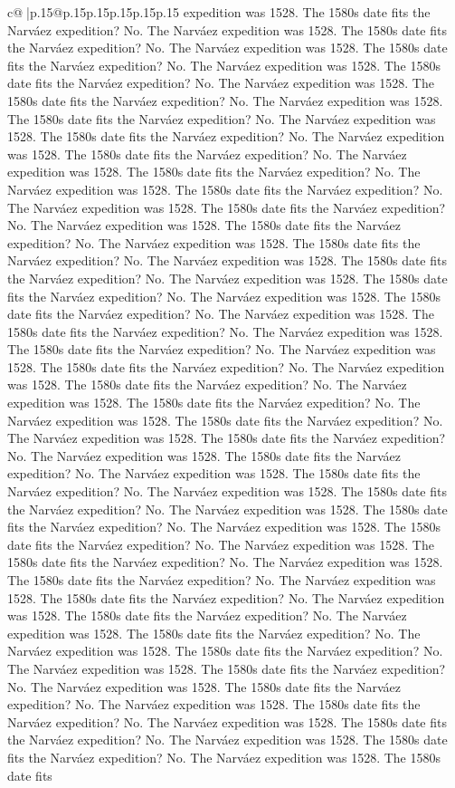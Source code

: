 \documentclass{article}
\begin{document}
{\begin{supertabular}{c@{$\;$}|p{.15\linewidth}@{}p{.15\linewidth}p{.15\linewidth}p{.15\linewidth}p{.15\linewidth}p{.15\linewidth}}
{{{expedition was 1528. The 1580s date fits the Narváez expedition? No. The Narváez expedition was 1528. The 1580s date fits the Narváez expedition? No. The Narváez expedition was 1528. The 1580s date fits the Narváez expedition? No. The Narváez expedition was 1528. The 1580s date fits the Narváez expedition? No. The Narváez expedition was 1528. The 1580s date fits the Narváez expedition? No. The Narváez expedition was 1528. The 1580s date fits the Narváez expedition? No. The Narváez expedition was 1528. The 1580s date fits the Narváez expedition? No. The Narváez expedition was 1528. The 1580s date fits the Narváez expedition? No. The Narváez expedition was 1528. The 1580s date fits the Narváez expedition? No. The Narváez expedition was 1528. The 1580s date fits the Narváez expedition? No. The Narváez expedition was 1528. The 1580s date fits the Narváez expedition? No. The Narváez expedition was 1528. The 1580s date fits the Narváez expedition? No. The Narváez expedition was 1528. The 1580s date fits the Narváez expedition? No. The Narváez expedition was 1528. The 1580s date fits the Narváez expedition? No. The Narváez expedition was 1528. The 1580s date fits the Narváez expedition? No. The Narváez expedition was 1528. The 1580s date fits the Narváez expedition? No. The Narváez expedition was 1528. The 1580s date fits the Narváez expedition? No. The Narváez expedition was 1528. The 1580s date fits the Narváez expedition? No. The Narváez expedition was 1528. The 1580s date fits the Narváez expedition? No. The Narváez expedition was 1528. The 1580s date fits the Narváez expedition? No. The Narváez expedition was 1528. The 1580s date fits the Narváez expedition? No. The Narváez expedition was 1528. The 1580s date fits the Narváez expedition? No. The Narváez expedition was 1528. The 1580s date fits the Narváez expedition? No. The Narváez expedition was 1528. The 1580s date fits the Narváez expedition? No. The Narváez expedition was 1528. The 1580s date fits the Narváez expedition? No. The Narváez expedition was 1528. The 1580s date fits the Narváez expedition? No. The Narváez expedition was 1528. The 1580s date fits the Narváez expedition? No. The Narváez expedition was 1528. The 1580s date fits the Narváez expedition? No. The Narváez expedition was 1528. The 1580s date fits the Narváez expedition? No. The Narváez expedition was 1528. The 1580s date fits the Narváez expedition? No. The Narváez expedition was 1528. The 1580s date fits the Narváez expedition? No. The Narváez expedition was 1528. The 1580s date fits the Narváez expedition? No. The Narváez expedition was 1528. The 1580s date fits the Narváez expedition? No. The Narváez expedition was 1528. The 1580s date fits the Narváez expedition? No. The Narváez expedition was 1528. The 1580s date fits the Narváez expedition? No. The Narváez expedition was 1528. The 1580s date fits the Narváez expedition? No. The Narváez expedition was 1528. The 1580s date fits the Narváez expedition? No. The Narváez expedition was 1528. The 1580s date fits the Narváez expedition? No. The Narváez expedition was 1528. The 1580s date fits the Narváez expedition? No. The Narváez expedition was 1528. The 1580s date fits }}}
\end{supertabular}}
\end{document}
